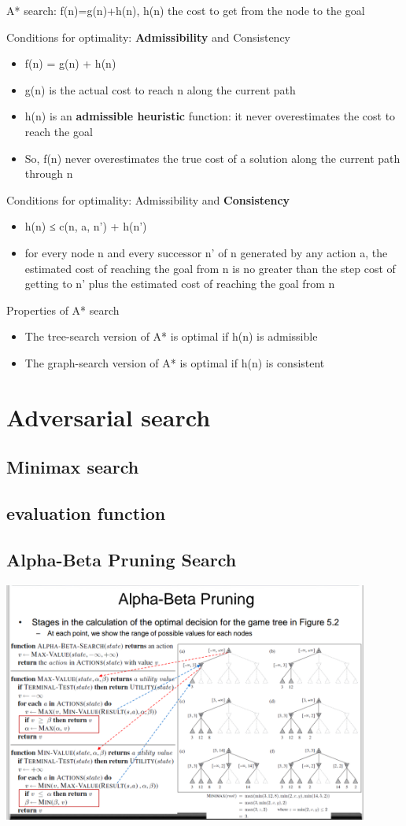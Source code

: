 \documentclass[11pt]{article}
\begin{document}
A* search:
f(n)=g(n)+h(n), h(n) the cost to get from the node to the goal


Conditions for optimality: \textbf{Admissibility} and Consistency
\begin{itemize}
\item f(n) = g(n) + h(n)
\item g(n) is the actual cost to reach n along the current path
\item h(n) is an \textbf{admissible heuristic} function: it never overestimates the cost
to reach the goal
\item So, f(n) never overestimates the true cost of a solution along the current
path through n
\end{itemize}


Conditions for optimality: Admissibility and \textbf{Consistency}
\begin{itemize}
\item h(n) ≤ c(n, a, n') + h(n')
\item for every node n and every successor n’ of n generated by any action a,
the estimated cost of reaching the goal from n is no greater than the step
cost of getting to n’ plus the estimated cost of reaching the goal from n
\end{itemize}


Properties of A* search
\begin{itemize}
\item The tree-search version of A* is optimal if h(n) is admissible
\item The graph-search version of A* is optimal if h(n) is consistent
\end{itemize}
\section{Adversarial search}
\label{sec:org5c2793b}

\subsection{Minimax search}
\label{sec:orgd4fe2bd}
\subsection{evaluation function}
\label{sec:orgf302591}
\subsection{Alpha-Beta Pruning Search}
\label{sec:orgfedd008}
\includegraphics[width=0.9\textwidth]{ABP}
\end{document}
